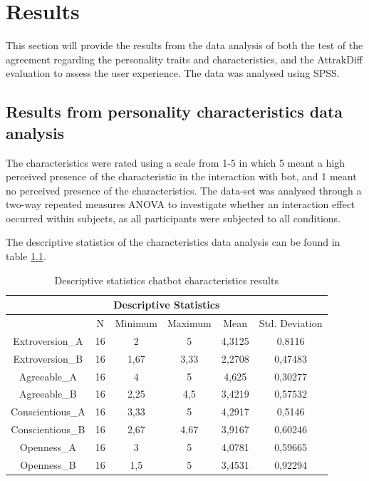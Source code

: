 \chapter{Results}
\label{chap:results}

This section will provide the results from the data analysis of both the test of the agreement regarding the personality traits and characteristics, and the AttrakDiff evaluation to assess the user experience. The data was analysed using SPSS.

\section{Results from personality characteristics data analysis}

The characteristics were rated using a scale from 1-5 in which 5 meant a high perceived presence of the characteristic in the interaction with bot, and 1 meant no perceived presence of the characteristics. The data-set was analysed through a two-way repeated measures ANOVA to investigate whether an interaction effect occurred within subjects, as all participants were subjected to all conditions.

The descriptive statistics of the characteristics data analysis can be found in table \ref{table:5}.

\begin{table}[h]
\centering
\begin{tabular}{cccccc}
\hline
\multicolumn{6}{c}{\textbf{Descriptive Statistics}} \\
\hline
& N & Minimum & Maximum & Mean & Std. Deviation \\
Extroversion_A & 16 & 2 & 5 & 4,3125 & 0,8116 \\
Extroversion_B & 16 & 1,67 & 3,33 & 2,2708 & 0,47483 \\
Agreeable_A & 16 & 4 & 5 & 4,625 & 0,30277 \\
Agreeable_B & 16 & 2,25 & 4,5 & 3,4219 & 0,57532 \\
Conscientious_A & 16 & 3,33 & 5 & 4,2917 & 0,5146 \\
Conscientious_B & 16 & 2,67 & 4,67 & 3,9167 & 0,60246 \\
Openness_A & 16 & 3 & 5 & 4,0781 & 0,59665 \\
Openness_B & 16 & 1,5 & 5 & 3,4531 & 0,92294 \\
\end{tabular}
 \caption{Descriptive statistics chatbot characteristics results}
 \label{table:5}
    \end{table}


